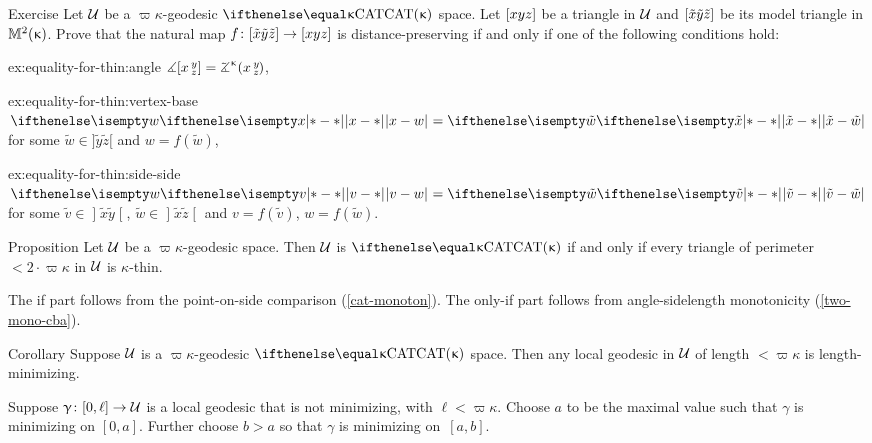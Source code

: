\begin{thm}{Exercise}\label{ex:equality-for-thin}
Let $\mathcal{U}$ be a $\varpi\kappa$-geodesic $\CAT\kappa$ space.
Let $[{x}{y}{z}]$ be a triangle in $\mathcal{U}$
and $[{\tilde x}{\tilde y}{\tilde z}]$ be its model triangle in $\mathbb{M}_{{}}^{2}({\upkappa})$.
Prove that the natural map $f\:\trig{\tilde x}{\tilde y}{\tilde z}\to \trig xyz$ 
 is distance-preserving if and only if one of the following conditions hold:

\begin{subthm}{ex:equality-for-thin:angle}
$\mangle\hinge x y z= \angk\kappa x y z$,
\end{subthm}

\begin{subthm}{ex:equality-for-thin:vertex-base}
$\dist{x}{w}{}=\dist{\tilde x}{\tilde w}{}$ for some  $\tilde w\in]\tilde y\tilde z[$ and
$w= f(\tilde w)$,   
\end{subthm}

\begin{subthm}{ex:equality-for-thin:side-side} 
$\dist{v}{w}{}=\dist{\tilde v}{\tilde w}{}$ for some  
$\tilde v\in \mathopen{]}\tilde x \tilde y\mathclose{[}$,  $\tilde w\in\mathopen{]}\tilde x \tilde z\mathclose{[}$
and $v=f(\tilde v)$, $w=f(\tilde w)$.
\end{subthm} 

\end{thm}

{\sloppy 

\begin{thm}{Proposition}\label{prop:k-thin}
Let $\mathcal{U}$ be a $\varpi\kappa$-geodesic space. 
Then $\mathcal{U}$ is  $\CAT\kappa$
if and only if every triangle of perimeter $<2\cdot \varpi\kappa$ in $\mathcal{U}$  is $\kappa$-thin.
\end{thm}

}

The if part follows from the point-on-side comparison (\ref{cat-monoton}).  
The only-if part follows from angle-sidelength  monotonicity (\ref{two-mono-cba}).
\qeds


\begin{thm}{Corollary}\label{cor:loc-geod-are-min}
Suppose $\mathcal{U}$ is a $\varpi\kappa$-geodesic $\CAT\kappa$ space.  
Then any local geodesic in $\mathcal{U}$ of length $<\varpi\kappa$ is length-minimizing.
\end{thm}

Suppose $\gamma\:[0,\ell]\to\spc{U}$ is a local geodesic  that is not minimizing, with $\ell<\varpi\kappa$.
Choose $a$ to be the maximal value 
such that $\gamma$ is minimizing on $[0,a]$.
Further choose $b>a$ so that $\gamma$ is minimizing on~$[a,b]$.

